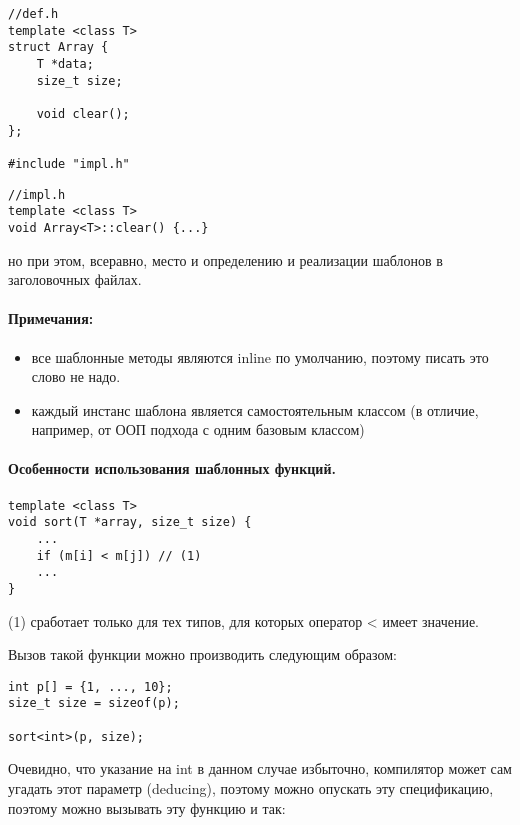 \begin{lstlisting}
//def.h
template <class T>
struct Array {
	T *data;
	size_t size;
	
	void clear();
};

#include "impl.h"
\end{lstlisting}

\begin{lstlisting}
//impl.h
template <class T>
void Array<T>::clear() {...}
\end{lstlisting}

но при этом, всеравно, место и определению и реализации шаблонов в заголовочных файлах.

\paragraph{Примечания:}

\begin{itemize}
\item все шаблонные методы являются inline по умолчанию, поэтому писать это слово не надо.

\item каждый инстанс шаблона является самостоятельным классом (в отличие, например, от ООП подхода с одним базовым классом)
\end{itemize}


\paragraph{Особенности использования шаблонных функций.}

\begin{lstlisting}
template <class T>
void sort(T *array, size_t size) {
	...
	if (m[i] < m[j]) // (1)
	...
}
\end{lstlisting}

(1) сработает только для тех типов, для которых оператор < имеет значение.

Вызов такой функции можно производить следующим образом:

\begin{lstlisting}
int p[] = {1, ..., 10};
size_t size = sizeof(p);

sort<int>(p, size);
\end{lstlisting}

Очевидно, что указание на int в данном случае избыточно, компилятор может сам угадать этот параметр (deducing), поэтому можно опускать эту спецификацию, поэтому
можно вызывать эту функцию и так:

